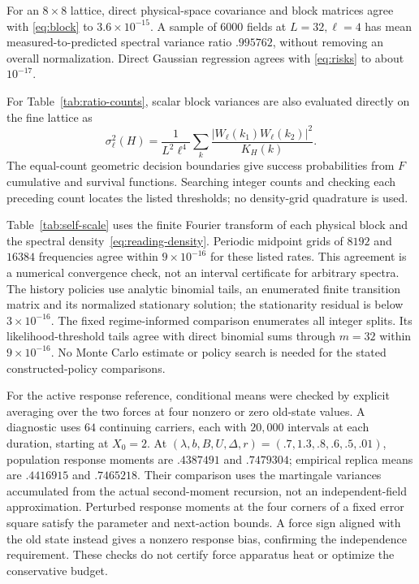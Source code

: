 \documentclass[12pt,a4paper]{article}
\begin{document}
For an $8\times8$ lattice, direct physical-space covariance and block
matrices agree with \eqref{eq:block} to $3.6\times10^{-15}$.
A sample of $6000$ fields at $L=32,\ell=4$ has mean
measured-to-predicted spectral variance ratio $.995762$, without
removing an overall normalization. Direct Gaussian regression agrees
with \eqref{eq:risks} to about $10^{-17}$.

For Table~\ref{tab:ratio-counts}, scalar block variances are also
evaluated directly on the fine lattice as
\[
 \sigma_\ell^2(H)=\frac1{L^2\ell^4}
 \sum_k\frac{|W_\ell(k_1)W_\ell(k_2)|^2}{K_H(k)}.
\]
The equal-count geometric decision boundaries give success
probabilities from $F$ cumulative and survival functions. Searching
integer counts and checking each preceding count locates the listed
thresholds; no density-grid quadrature is used.

Table~\ref{tab:self-scale} uses the finite Fourier transform of each
physical block and the spectral density~\eqref{eq:reading-density}.
Periodic midpoint grids of $8192$ and $16384$ frequencies agree within
$9\times10^{-16}$ for these listed rates. This agreement is a numerical
convergence check, not an interval certificate for arbitrary spectra.
The history policies use analytic binomial tails, an enumerated
finite transition matrix and its normalized stationary solution;
the stationarity residual is below $3\times10^{-16}$. The fixed
regime-informed comparison enumerates all integer splits. Its
likelihood-threshold tails agree with direct binomial sums through
$m=32$ within $9\times10^{-16}$. No Monte Carlo estimate or policy
search is needed for the stated constructed-policy comparisons.

For the active response reference, conditional means were checked
by explicit averaging over the two forces at four nonzero or zero
old-state values. A diagnostic uses $64$ continuing carriers, each
with $20{,}000$ intervals at each duration, starting at $X_0=2$.
At $(\lambda,b,B,U,\Delta,r)=(.7,1.3,.8,.6,.5,.01)$, population
response moments are $.4387491$ and $.7479304$; empirical replica
means are $.4416915$ and $.7465218$. Their comparison uses the
martingale variances accumulated from the actual second-moment
recursion, not an independent-field approximation.
Perturbed response moments at the four corners of a fixed error
square satisfy the parameter and next-action bounds. A force sign
aligned with the old state instead gives a nonzero response bias,
confirming the independence requirement. These checks do not
certify force apparatus heat or optimize the conservative budget.
\end{document}
